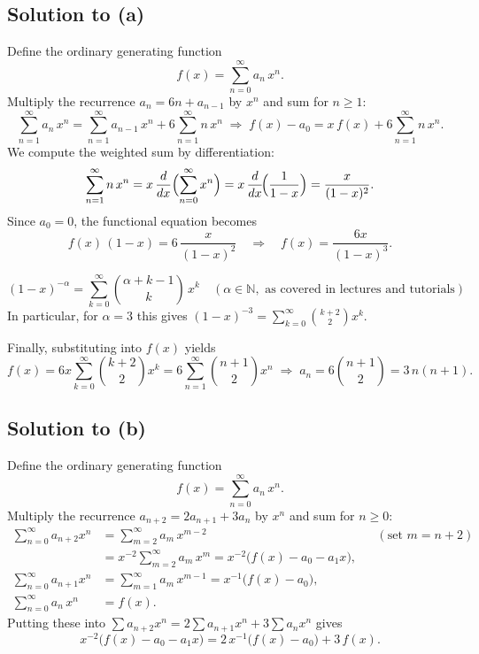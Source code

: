 \documentclass[docmute]{article}
\begin{document}
\subsection*{Solution to (a)}
Define the ordinary generating function
\[
f(x)=\sum_{n=0}^\infty a_n\,x^n.
\]
Multiply the recurrence \(a_n = 6n + a_{n-1}\) by \(x^n\) and sum for \(n\ge1\):
\[
\sum_{n=1}^\infty a_n\,x^n
= \sum_{n=1}^\infty a_{n-1}\,x^n
  + 6\sum_{n=1}^\infty n\,x^n
\;\Longrightarrow\;
f(x)-a_0 = x\,f(x) + 6\sum_{n=1}^\infty n\,x^n.
\]
We compute the weighted sum by differentiation:
\[
\sum_{n=1}^\infty n\,x^n
= x\,\frac{d}{dx}\Bigl(\sum_{n=0}^\infty x^n\Bigr)
= x\,\frac{d}{dx}\!\Bigl(\frac1{1-x}\Bigr)
= \frac{x}{(1-x)^2}.
\]
Since \(a_0=0\), the functional equation becomes
\[
f(x)\,(1 - x)
= 6\,\frac{x}{(1-x)^2}
\quad\Longrightarrow\quad
f(x) = \frac{6x}{(1-x)^3}.
\]

\[
\boxed{
(1 - x)^{-\alpha}
= \sum_{k=0}^\infty \binom{\alpha + k - 1}{k}\,x^k
\quad(\alpha\in\mathbb{N},\text{ as covered in lectures and tutorials})
}
\]
\noindent
In particular, for \(\alpha=3\) this gives \((1-x)^{-3}=\sum_{k=0}^\infty\binom{k+2}{2}x^k\).

Finally, substituting into \(f(x)\) yields
\[
f(x)
= 6x\sum_{k=0}^\infty\binom{k+2}{2}x^k
= 6\sum_{n=1}^\infty\binom{n+1}{2}x^n
\;\Longrightarrow\;
a_n = 6\binom{n+1}{2} = 3\,n(n+1).
\]


\subsection*{Solution to (b)}
Define the ordinary generating function
\[
f(x)=\sum_{n=0}^\infty a_n\,x^n.
\]
Multiply the recurrence \(a_{n+2}=2a_{n+1}+3a_n\) by \(x^n\) and sum for \(n\ge0\):
\begin{align*}
\sum_{n=0}^\infty a_{n+2}x^n
&= \sum_{m=2}^\infty a_m\,x^{m-2}
 &&(\text{set }m=n+2)\\
&= x^{-2}\sum_{m=2}^\infty a_m\,x^m
 = x^{-2}\bigl(f(x)-a_0 - a_1x\bigr),\\
\sum_{n=0}^\infty a_{n+1}x^n
&= \sum_{m=1}^\infty a_m\,x^{m-1}
 = x^{-1}\bigl(f(x)-a_0\bigr),\\
\sum_{n=0}^\infty a_n\,x^n
&= f(x).
\end{align*}
Putting these into 
\(\sum a_{n+2}x^n = 2\sum a_{n+1}x^n + 3\sum a_n x^n\)
gives
\[
x^{-2}\bigl(f(x)-a_0 - a_1x\bigr)
=2\,x^{-1}\bigl(f(x)-a_0\bigr)
+3\,f(x).
\]
\end{document}
